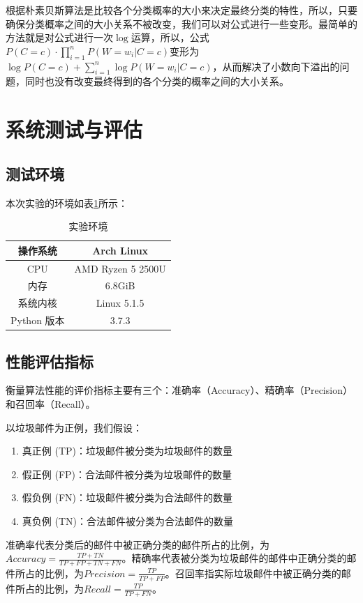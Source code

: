 \documentclass[UTF8,zihao=-4]{ctexart}
\begin{document}
	根据朴素贝斯算法是比较各个分类概率的大小来决定最终分类的特性，所以，只要确保分类概率之间的大小关系不被改变，我们可以对公式进行一些变形。最简单的方法就是对公式进行一次$\log$运算，所以，公式$P(C=c) \cdot \prod\limits_{i=1}^{n} P(W=w_i|C=c)$变形为$\log P(C=c) + \sum\limits_{i=1}^{n}\log P(W=w_i|C=c)$，从而解决了小数向下溢出的问题，同时也没有改变最终得到的各个分类的概率之间的大小关系。

\newpage
\section{系统测试与评估}

\subsection{测试环境}
	本次实验的环境如表\ref{tab:env}所示：
	\begin{table}[!htpb]
		\centering
		\caption{实验环境}
		\label{tab:env}
		\begin{tabular}{|c|c|}
			\hline
			操作系统&Arch Linux\\
			\hline
			CPU&AMD Ryzen 5 2500U\\
			\hline
			内存&6.8GiB\\
			\hline
			系统内核&Linux 5.1.5\\
			\hline
			Python 版本&3.7.3\\
			\hline
		\end{tabular}
	\end{table}

\subsection{性能评估指标}
	衡量算法性能的评价指标主要有三个：准确率（Accuracy）、精确率（Precision）和召回率（Recall）。
	
	以垃圾邮件为正例，我们假设：
	
	\begin{enumerate}
		\item 真正例 (TP)：垃圾邮件被分类为垃圾邮件的数量
		\item 假正例 (FP)：合法邮件被分类为垃圾邮件的数量
		\item 假负例 (FN)：垃圾邮件被分类为合法邮件的数量
		\item 真负例 (TN)：合法邮件被分类为合法邮件的数量
	\end{enumerate}

	准确率代表分类后的邮件中被正确分类的邮件所占的比例，为$Accuracy=\frac{TP+TN}{TP+FP+TN+FN}$。精确率代表被分类为垃圾邮件的邮件中正确分类的邮件所占的比例，为$Precision=\frac{TP}{TP+FP}$。召回率指实际垃圾邮件中被正确分类的邮件所占的比例，为$Recall=\frac{TP}{TP+FN}$。
\end{document}
